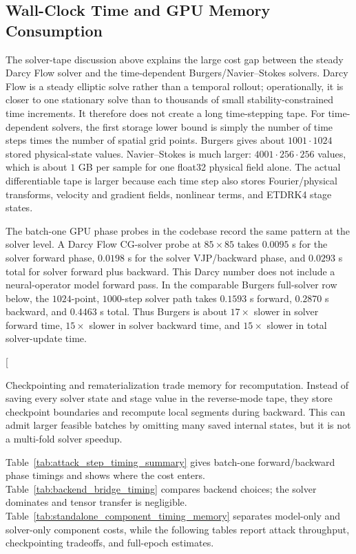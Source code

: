 ﻿\documentclass[letterpaper]{article} %
\begin{document}
\subsection*{Wall-Clock Time and GPU Memory Consumption}

The solver-tape discussion above explains the large cost gap between the steady
Darcy Flow solver and the time-dependent Burgers/Navier--Stokes solvers. Darcy
Flow is a steady elliptic solve rather than a temporal rollout; operationally,
it is closer to one stationary solve than to thousands of small
stability-constrained time increments. It therefore does not create a long
time-stepping tape. For time-dependent solvers, the first storage lower bound is
simply the number of time steps times the number of spatial grid points. Burgers
gives about $1001\cdot1024$ stored physical-state values. Navier--Stokes is much
larger: $4001\cdot256\cdot256$ values, which is about $1$ GB per sample for one
float32 physical field alone. The actual differentiable tape is larger because
each time step also stores Fourier/physical transforms, velocity and gradient
fields, nonlinear terms, and ETDRK4 stage states.

The batch-one GPU phase probes in the codebase record the same pattern at the
solver level. A Darcy Flow CG-solver probe at $85\times85$ takes $0.0095$ s for
the solver forward phase, $0.0198$ s for the solver VJP/backward phase, and
$0.0293$ s total for solver forward plus backward. This Darcy number does not
include a neural-operator model forward pass. In the comparable Burgers
full-solver row below, the $1024$-point, $1000$-step solver path takes $0.1593$ s
forward, $0.2870$ s backward, and $0.4463$ s total. Thus Burgers is about
$17\times$ slower in solver forward time, $15\times$ slower in solver backward
time, and $15\times$ slower in total solver-update time.

\clearpage
\twocolumn[
\noindent
\begin{minipage}{0.485\textwidth}
\setlength{\parindent}{1em}
Checkpointing and rematerialization trade memory for recomputation. Instead of
saving every solver state and stage value in the reverse-mode tape, they store
checkpoint boundaries and recompute local segments during backward. This can
admit larger feasible batches by omitting many saved internal states, but it is
not a multi-fold solver speedup.
\end{minipage}\hfill
\begin{minipage}{0.485\textwidth}
\setlength{\parindent}{1em}
Table~\ref{tab:attack_step_timing_summary} gives batch-one forward/backward phase timings and shows where the cost
enters. Table~\ref{tab:backend_bridge_timing} compares backend choices; the solver dominates and tensor
transfer is negligible. Table~\ref{tab:standalone_component_timing_memory} separates model-only and solver-only component
costs, while the following tables report attack throughput, checkpointing
tradeoffs, and full-epoch estimates.
\end{minipage}
\vspace{0.25em}
\end{document}
